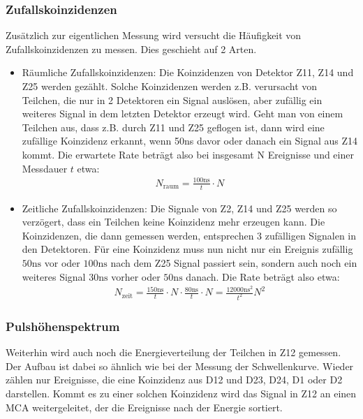 \subsubsection{Zufallskoinzidenzen}
Zusätzlich zur eigentlichen Messung wird versucht die Häufigkeit von Zufallskoinzidenzen zu messen. Dies geschieht auf 2 Arten.
\begin{itemize}
	\item Räumliche Zufallskoinzidenzen: Die Koinzidenzen von Detektor Z11, Z14 und Z25 werden gezählt. Solche Koinzidenzen werden z.B. verursacht von Teilchen, die nur in 2 Detektoren ein Signal auslösen, aber zufällig ein weiteres Signal in dem letzten Detektor erzeugt wird. Geht man von einem Teilchen aus, dass z.B. durch Z11 und Z25 geflogen ist, dann wird eine zufällige Koinzidenz erkannt, wenn 50ns davor oder danach ein Signal aus Z14 kommt. Die erwartete Rate beträgt also bei insgesamt N Ereignisse und einer Messdauer $t$ etwa: 
\begin{align}
N_{\text{raum}} = \frac{100\si{\nano\second}}{t} \cdot N
\label{equ:random_space}
\end{align}

	\item Zeitliche Zufallskoinzidenzen: Die Signale von Z2, Z14 und Z25 werden so verzögert, dass ein Teilchen keine Koinzidenz mehr erzeugen kann. Die Koinzidenzen, die dann gemessen werden, entsprechen 3 zufälligen Signalen in den Detektoren. Für eine Koinzidenz muss nun nicht nur ein Ereignis zufällig $50\si{\nano \second}$ vor oder $100 \si{\nano \second}$ nach dem Z25 Signal passiert sein, sondern auch noch ein weiteres Signal $30\si{\nano \second}$ vorher oder $50\si{\nano \second}$ danach. Die Rate beträgt also etwa:
	\begin{align}
N_{\text{zeit}} = \frac{150\si{\nano\second}}{t} \cdot N \cdot \frac{80\si{\nano\second}}{t} \cdot N = \frac{12000 \si{\nano\second}^2}{t^2}N^2
\label{equ:random_time}
\end{align}

\end{itemize}

\subsubsection{Pulshöhenspektrum}
Weiterhin wird auch noch die Energieverteilung der Teilchen in Z12 gemessen. Der Aufbau ist dabei so ähnlich wie bei der Messung der Schwellenkurve. Wieder zählen nur Ereignisse, die eine Koinzidenz aus D12 und D23, D24, D1 oder D2 darstellen. Kommt es zu einer solchen Koinzidenz wird das Signal in Z12 an einen MCA weitergeleitet, der die Ereignisse nach der Energie sortiert.
